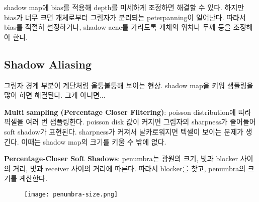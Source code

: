 shadow map에 bias를 적용해 depth를 미세하게 조정하면 해결할 수 있다. 하지만 bias가 너무 크면 개체로부터 그림자가 분리되는 peterpanning이 일어난다. 따라서 bias를 적절히 설정하거나, shadow acne를 가리도록 개체의 위치나 두께 등을 조정해야 한다.

\subsection{Shadow Aliasing}

그림자 경계 부분이 계단처럼 울퉁불퉁해 보이는 현상. shadow map을 키워 샘플링을 많이 하면 해결된다. 그게 아니면...

\textbf{Multi sampling (Percentage Closer Filtering)}: poisson distribution에 따라 픽셀을 여러 번 샘플링한다. poisson disk 값이 커지면 그림자의 sharpness가 줄어들어 soft shadow가 표현된다. sharpness가 커져서 날카로워지면 텍셀이 보이는 문제가 생긴다. 이때는 shadow map의 크기를 키울 수 밖에 없다.

\textbf{Percentage-Closer Soft Shadows}: penumbra는 광원의 크기, 빛과 blocker 사이의 거리, 빛과 receiver 사이의 거리에 따른다. 따라서 blocker를 찾고, penumbra의 크기를 계산한다.

\begin{figure}[h]
  \centering
  \texttt{[image: penumbra-size.png]}
\end{figure}
